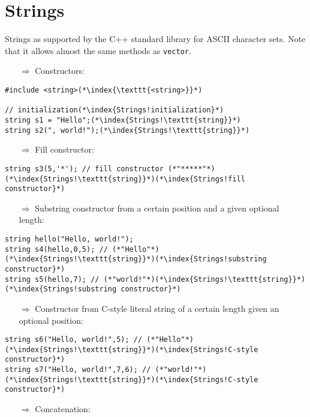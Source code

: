 \documentclass[10pt]{article}
\begin{document}
\section{Strings}
\small
Strings as supported by the C++ standard library for ASCII character sets. Note that it allows almost the same methods as \texttt{vector}.
\begin{enumerate}
\item[$\Rightarrow$] Constructors:
\end{enumerate}
\begin{lstlisting}
#include <string>(*\index{\texttt{<string>}}*)

// initialization(*\index{Strings!initialization}*)
string s1 = "Hello";(*\index{Strings!\texttt{string}}*)
string s2(", world!");(*\index{Strings!\texttt{string}}*)
\end{lstlisting}
\begin{enumerate}
\item[$\Rightarrow$] Fill constructor:
\end{enumerate}
\begin{lstlisting}
string s3(5,'*'); // fill constructor (*"*****"*)(*\index{Strings!\texttt{string}}*)(*\index{Strings!fill constructor}*)
\end{lstlisting}
\begin{enumerate}
\item[$\Rightarrow$] Substring constructor from a certain position and a given optional length:
\end{enumerate}
\begin{lstlisting}
string hello("Hello, world!");
string s4(hello,0,5); // (*"Hello"*)(*\index{Strings!\texttt{string}}*)(*\index{Strings!substring constructor}*)
string s5(hello,7); // (*"world!"*)(*\index{Strings!\texttt{string}}*)(*\index{Strings!substring constructor}*)
\end{lstlisting}
\begin{enumerate}
\item[$\Rightarrow$] Constructor from C-style literal string of a certain length given an optional position:
\end{enumerate}
\begin{lstlisting}
string s6("Hello, world!",5); // (*"Hello"*)(*\index{Strings!\texttt{string}}*)(*\index{Strings!C-style constructor}*)
string s7("Hello, world!",7,6); // (*"world!"*)(*\index{Strings!\texttt{string}}*)(*\index{Strings!C-style constructor}*)
\end{lstlisting}
\begin{enumerate}
\item[$\Rightarrow$] Concatenation:
\end{enumerate}
\end{document}
